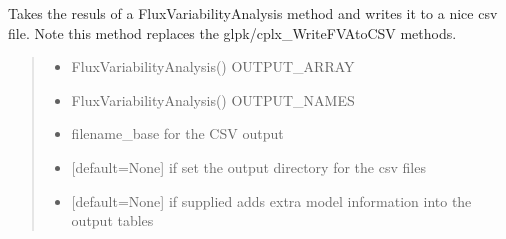 \documentclass[letterpaper,12pt,english]{sphinxmanual}
\begin{document}
\begin{fulllineitems}

\pysigstartsignatures
\pysiglinewithargsret
{}
{\sphinxparamcomma {}\sphinxparamcomma {}\sphinxparamcomma {}\sphinxparamcomma {}}
{}
\pysigstopsignatures
\sphinxAtStartPar
Takes the resuls of a FluxVariabilityAnalysis method and writes it to a nice csv file. Note this method replaces the glpk/cplx\_WriteFVAtoCSV methods.
\begin{quote}\begin{description}
\begin{itemize}
\item {} 
\sphinxAtStartPar
{} \textendash{} FluxVariabilityAnalysis() OUTPUT\_ARRAY

\item {} 
\sphinxAtStartPar
{} \textendash{} FluxVariabilityAnalysis() OUTPUT\_NAMES

\item {} 
\sphinxAtStartPar
{} \textendash{} filename\_base for the CSV output

\item {} 
\sphinxAtStartPar
{} \textendash{} {[}default=None{]} if set the output directory for the csv files

\item {} 
\sphinxAtStartPar
{} \textendash{} {[}default=None{]} if supplied adds extra model information into the output tables

\end{itemize}

\end{description}\end{quote}

\end{fulllineitems}
\end{document}

